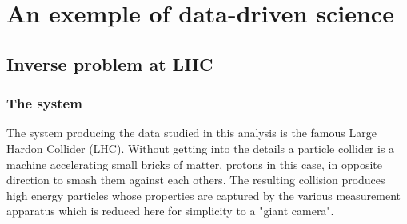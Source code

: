 
\chapter{An exemple of data-driven science}  %
\label{chap:intro_stat}
\ifpdf
    \graphicspath{{Chapter1/Figs/Raster/}{Chapter1/Figs/PDF/}{Chapter1/Figs/}}
\else
    \graphicspath{{Chapter1/Figs/Vector/}{Chapter1/Figs/}}
\fi














\section{Inverse problem at LHC} %
\label{sec:inverse_problem_at_lhc}







\subsection{The system} %
\label{sub:the_system}

The system producing the data studied in this analysis is the famous Large Hardon Collider (LHC).
Without getting into the details a particle collider is a machine accelerating small bricks of matter, protons in this case, in opposite direction to smash them against each others.
The resulting collision produces high energy particles whose properties are captured by the various measurement apparatus which is reduced here for simplicity to a "giant camera".

